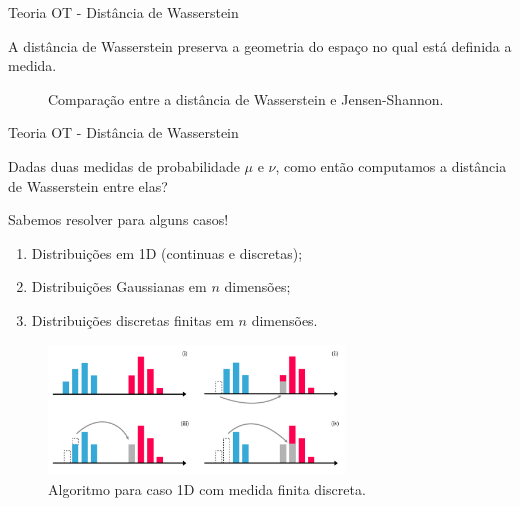 \documentclass[10pt]{beamer}
\begin{document}
\begin{frame}[fragile]{Teoria OT - Distância de Wasserstein}

	A distância de Wasserstein preserva a geometria do espaço
	no qual está definida a medida.

	\begin{figure}[H]
		\centering
		\def\svgscale{0.45}
		
		\caption{Comparação entre a distância de Wasserstein e Jensen-Shannon.}
		\label{fig:pub}
	\end{figure}

\end{frame}

\begin{frame}[fragile]{Teoria OT - Distância de Wasserstein}

	Dadas duas medidas de probabilidade $\mu$ e $\nu$,
	como então computamos a distância de Wasserstein
	entre elas?

	\vspace{3mm}
	Sabemos resolver para alguns casos!
	\begin{enumerate}
		\item Distribuições em 1D (continuas e discretas);
		\item Distribuições Gaussianas em $n$ dimensões;
		\item Distribuições discretas finitas em $n$ dimensões.
	\end{enumerate}

	\begin{figure}[H]
		\begin{center}
			\includegraphics[width=0.7\textwidth]{Figures/ot-1d-discrete.pdf}
		\end{center}
		\caption{Algoritmo para caso 1D com medida finita discreta.}
	\end{figure}

\end{frame}
\end{document}
